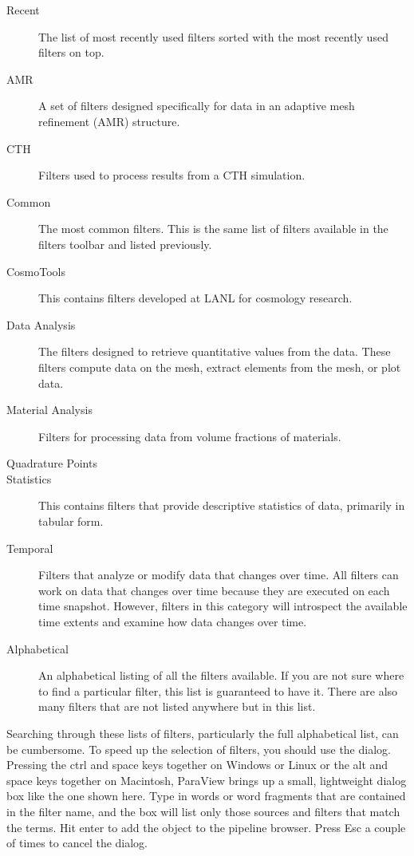 \begin{description}
\item[Recent] The list of most recently used filters sorted with the most
  recently used filters on top.
\item[AMR] A set of filters designed specifically for data in an adaptive
  mesh refinement (AMR)  structure.
\item[CTH] Filters used to process results from a CTH  simulation.
\item[Common] The most common filters.  This is the same list of filters
  available in the filters toolbar and listed previously.
\item[CosmoTools] This contains filters developed at LANL for cosmology
  research.
\item[Data Analysis] The filters designed to retrieve quantitative values
  from the data.  These filters compute data on the mesh, extract elements
  from the mesh, or plot data.
\item[Material Analysis] Filters for processing data from volume fractions
  of materials.
\item[Quadrature Points] 
\item[Statistics] This contains filters that provide descriptive
  statistics of data, primarily in tabular form.
\item[Temporal] Filters that analyze or modify data that changes over time.
  All filters can work on data that changes over time because they are
  executed on each time snapshot.  However, filters in this category will
  introspect the available time extents and examine how data changes over
  time.
\item[Alphabetical] An alphabetical listing of all the filters available.
  If you are not sure where to find a particular filter, this list is
  guaranteed to have it.  There are also many filters that are not listed
  anywhere but in this list.
\end{description}




Searching through these lists of filters, particularly the full
alphabetical list, can be cumbersome.  To speed up the selection of
filters, you should use the  dialog.  Pressing the ctrl
and space keys together on Windows or Linux or the alt and space keys
together on Macintosh, ParaView brings up a small, lightweight dialog box
like the one shown here.  Type in words or word fragments that are
contained in the filter name, and the box will list only those sources and
filters that match the terms.  Hit enter to add the object to the pipeline
browser.  Press Esc a couple of times to cancel the dialog.


